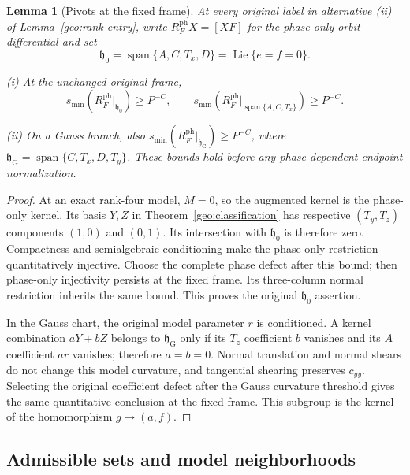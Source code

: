 \documentclass[11pt]{amsart}
\newtheorem{lemma}[theorem]{Lemma}
\theoremstyle{definition}
\theoremstyle{remark}
\numberwithin{equation}{section}
\begin{document}
\begin{lemma}[Pivots at the fixed frame]\label{geo:original-subgroup-pivots}
At every original label in alternative \textup{(ii)} of Lemma~\ref{geo:rank-entry}, write $R_F^{\mathrm{ph}}X=[XF]$ for the phase-only orbit differential and set
\[
\mathfrak h_0=\operatorname{span}\{A,C,T_x,D\}=\operatorname{Lie}\{e=f=0\}.
\]

\noindent\textup{(i)} At the unchanged original frame,
\[
s_{\min}(R_F^{\mathrm{ph}}|_{\mathfrak h_0})\ge P^{-C},\qquad s_{\min}(R_F^{\mathrm{ph}}|_{\operatorname{span}\{A,C,T_x\}})\ge P^{-C}.
\]

\noindent\textup{(ii)} On a Gauss branch, also $s_{\min}(R_F^{\mathrm{ph}}|_{\mathfrak h_{\mathrm G}})\ge P^{-C}$, where $\mathfrak h_{\mathrm G}=\operatorname{span}\{C,T_x,D,T_y\}$. These bounds hold before any phase-dependent endpoint normalization.
\end{lemma}
\begin{proof}
At an exact rank-four model, $M=0$, so the augmented kernel is the phase-only kernel. Its basis $Y,Z$ in Theorem~\ref{geo:classification} has respective $(T_y,T_z)$ components $(1,0)$ and $(0,1)$. Its intersection with $\mathfrak h_0$ is therefore zero. Compactness and semialgebraic conditioning make the phase-only restriction quantitatively injective. Choose the complete phase defect after this bound; then phase-only injectivity persists at the fixed frame. Its three-column normal restriction inherits the same bound. This proves the original $\mathfrak h_0$ assertion.

In the Gauss chart, the original model parameter $r$ is conditioned. A kernel combination $aY+bZ$ belongs to $\mathfrak h_{\mathrm G}$ only if its $T_z$ coefficient $b$ vanishes and its $A$ coefficient $ar$ vanishes; therefore $a=b=0$. Normal translation and normal shears do not change this model curvature, and tangential shearing preserves $c_{yy}$. Selecting the original coefficient defect after the Gauss curvature threshold gives the same quantitative conclusion at the fixed frame. This subgroup is the kernel of the homomorphism $g\mapsto(a,f)$.
\end{proof}

\subsection{Admissible sets and model neighborhoods}\label{geo:activity}\label{geo:activity-subsection}
\end{document}
